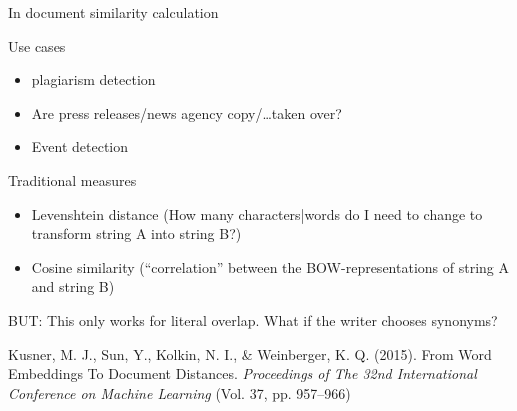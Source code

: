 \documentclass[compress]{beamer}
\begin{document}
\begin{frame}{In document similarity calculation}
	\begin{block}{Use cases}
		\begin{itemize}
			\item plagiarism detection
			\item Are press releases/news agency copy/\ldots taken over?
			\item Event detection
		\end{itemize}
	\end{block}
	\pause
	\begin{block}{Traditional measures}
		\begin{itemize}
			\item Levenshtein distance (How many characters|words do I need to change to transform string A into string B?)
			\item Cosine similarity (``correlation'' between the BOW-representations of string A and string B)
		\end{itemize}
	\end{block}
\end{frame}


\begin{frame}[plain]
	BUT: This only works for literal overlap. What if the writer chooses synonyms?
	\pause 
	
	
	
	\tiny{Kusner, M. J., Sun, Y., Kolkin, N. I., \& Weinberger, K. Q. (2015). From Word Embeddings To Document Distances. \textit{Proceedings of The 32nd International Conference on Machine Learning} (Vol. 37, pp. 957–966)}
\end{frame}
\end{document}
